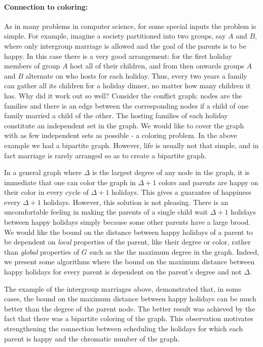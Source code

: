 \documentclass[11pt]{article}
\begin{document}
\paragraph{Connection to coloring:} As in many problems in computer science, for some special inputs the
problem is simple. For example, imagine a society partitioned into two
groups, say $A$ and $B$, where only intergroup marriage is allowed and
the goal of the parents is to be happy. In this case there is a very good
arrangement: for the first holiday members of group $A$ host all of
their children, and from then onwards groups $A$ and $B$ alternate on
who hosts for each holiday. Thus, every two years a family can gather
all its children for a holiday dinner, no matter how many children it
has. Why did it work out so well?
Consider the conflict graph: nodes are the families and there is an
edge between the corresponding nodes if a child of one family married
a child of the other. The hosting families of each holiday constitute
an independent set in the graph. We would like to cover the graph with
as few independent sets as possible - a coloring problem. In the above
example we had a bipartite graph. However, life is usually not that
simple, and in fact marriage is rarely arranged so as to create a
bipartite graph.

In a general graph where $\Delta$ is the largest degree of any node in
the graph, it is immediate that one can color the graph in $\Delta+1$
colors and parents are happy on their color in every cycle of
$\Delta+1$ holidays. This gives a guarantee of happiness every $\Delta+1$
holidays. However, this solution is not pleasing. There is an
uncomfortable feeling in making the parents of a single child wait
$\Delta+1$ holidays between happy holidays simply because some other parents
have a large brood. We would like the bound on the distance
between happy holidays of a parent to be dependent on {\em local} properties of the parent, like their degree or color,
rather than {\em global} properties of $G$ such as the the maximum degree in the graph. Indeed, we present some
algorithms where the bound on the maximum distance between happy holidays
for every parent is dependent on the parent's degree and not $\Delta$.

The example of the intergroup marriages above, demonstrated that, in
some cases, the bound on the maximum distance between happy holidays
can be much better than the degree of the parent node. The better
result was achieved by the fact that there was a bipartite coloring of
the graph. This observation motivates strengthening the connection
between scheduling the holidays for which each parent
is happy and the chromatic number of the graph.
\end{document}
